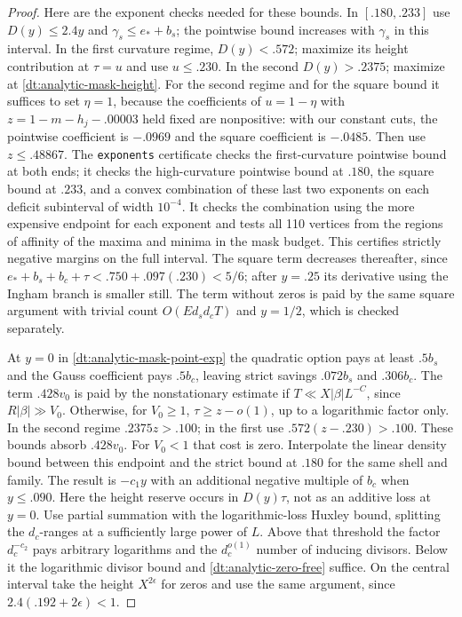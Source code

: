 \documentclass[11pt,a4paper]{article}
\theoremstyle{paperplain}
\numberwithin{equation}{section}
\begin{document}
\begin{proof}
Here are the exponent checks needed for these bounds. In
\([.180,.233]\) use \(D(y)\le2.4y\) and
\(\gamma_s\le e_*+b_s\); the pointwise bound increases with
\(\gamma_s\) in this interval. In the first curvature regime,
\(D(y)<.572\); maximize its height contribution at \(\tau=u\)
and use \(u\le.230\). In the second \(D(y)>.2375\);
maximize at \eqref{dt:analytic-mask-height}. For the second
regime and for the square bound it suffices to set
\(\eta=1\), because the coefficients of \(u=1-\eta\)
with \(z=1-m-h_j-.00003\) held fixed are nonpositive:
with our constant cuts, the pointwise coefficient is
\(-.0969\) and the square coefficient is \(-.0485\).
Then use \(z\le.48867\). The \texttt{exponents} certificate
checks the first-curvature pointwise bound at both ends;
it checks the high-curvature pointwise bound at \(.180\),
the square bound at \(.233\), and a convex combination of
these last two exponents on each deficit subinterval of
width \(10^{-4}\). It checks the combination using the more
expensive endpoint for each exponent and tests all 110
vertices from the regions of affinity of the maxima and minima
in the mask budget. This certifies strictly negative margins
on the full interval. The square term decreases thereafter,
since \(e_*+b_s+b_c+\tau<.750+.097(.230)<5/6\);
after \(y=.25\) its derivative using the Ingham branch is
smaller still. The term without zeros is paid by the same
square argument with trivial count \(O(Ed_s d_c T)\) and
\(y=1/2\), which is checked separately.

At \(y=0\) in \eqref{dt:analytic-mask-point-exp} the quadratic
option pays at least \(.5b_s\) and the Gauss coefficient pays
\(.5b_c\), leaving strict savings \(.072b_s\) and \(.306b_c\).
The term \(.428v_0\) is paid by the nonstationary estimate if
\(T\ll X|\beta|L^{-C}\), since \(R|\beta|\gg V_0\).
Otherwise, for \(V_0\ge1\), \(\tau\ge z-o(1)\), up to a
logarithmic factor only. In the second regime
\(.2375z>.100\); in the first use
\(.572(z-.230)>.100\). These bounds absorb \(.428v_0\).
For \(V_0<1\) that cost is zero. Interpolate the linear density
bound between this endpoint and the strict bound at \(.180\)
for the same shell and family. The result is \(-c_1y\) with
an additional negative multiple of \(b_c\) when \(y\le.090\).
Here the height reserve occurs in \(D(y)\tau\), not as an
additive loss at \(y=0\). Use partial summation with the
logarithmic-loss Huxley bound, splitting the \(d_c\)-ranges
at a sufficiently large power of \(L\).
Above that threshold the factor \(d_c^{-c_2}\) pays arbitrary
logarithms and the \(d_c^{o(1)}\) number of inducing divisors.
Below it the logarithmic divisor bound and
\eqref{dt:analytic-zero-free} suffice. On the central interval
take the height \(X^{2\epsilon}\) for zeros and use the same
argument, since \(2.4(.192+2\epsilon)<1\).


\end{proof}
\end{document}
